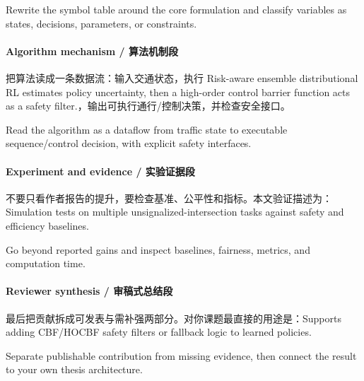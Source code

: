 \documentclass[UTF8,a4paper,11pt,fontset=fandol]{ctexart}
\begin{document}
Rewrite the symbol table around the core formulation and classify variables as states, decisions, parameters, or constraints.

\paragraph{Algorithm mechanism / 算法机制段}把算法读成一条数据流：输入交通状态，执行 Risk-aware ensemble distributional RL estimates policy uncertainty, then a high-order control barrier function acts as a safety filter.，输出可执行通行/控制决策，并检查安全接口。

Read the algorithm as a dataflow from traffic state to executable sequence/control decision, with explicit safety interfaces.

\paragraph{Experiment and evidence / 实验证据段}不要只看作者报告的提升，要检查基准、公平性和指标。本文验证描述为：Simulation tests on multiple unsignalized-intersection tasks against safety and efficiency baselines.

Go beyond reported gains and inspect baselines, fairness, metrics, and computation time.

\paragraph{Reviewer synthesis / 审稿式总结段}最后把贡献拆成可发表与需补强两部分。对你课题最直接的用途是：Supports adding CBF/HOCBF safety filters or fallback logic to learned policies.

Separate publishable contribution from missing evidence, then connect the result to your own thesis architecture.
\end{document}

